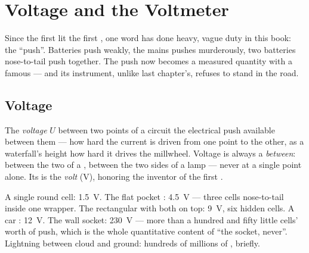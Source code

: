 \chapter{Voltage and the Voltmeter}\label{ch:g8:voltage-voltmeter}

Since the first  lit the first , one word has done
heavy, vague duty in this book: the ``push''. Batteries push
weakly, the mains pushes murderously, two batteries nose-to-tail
push together. The push now becomes a measured quantity with a
famous  --- and its instrument, unlike last chapter's,
refuses to stand in the road.

\section{Voltage}

\begin{definition}[Voltage]\label{def:g8:voltage-voltmeter:voltage}
The \emph{voltage} $U$ between two points of a
circuit  the electrical push available between them ---
how hard the current is driven from one point to the other, as
a waterfall's height  how hard it drives the
millwheel. Voltage is always a \emph{between}: between the two
 of a , between the two sides of a lamp ---
never at a single point alone. Its  is the
\emph{volt} (\unit{V}), honoring the inventor of
the first .
\end{definition}

\begin{example}\label{ex:g8:voltage-voltmeter:values}
A single round cell: \qty{1.5}{V}. The flat pocket :
\qty{4.5}{V} --- three cells nose-to-tail inside one wrapper.
The rectangular  with both  on top:
\qty{9}{V}, six hidden cells. A car : \qty{12}{V}. The
wall socket: \qty{230}{V} --- more than a hundred and fifty
little cells' worth of push, which is the whole quantitative
content of ``the socket, never''. Lightning between cloud and
ground: hundreds of millions of , briefly.
\end{example}

